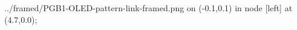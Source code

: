 \documentclass[preview]{standalone}
\begin{document}
\begin{zoomed}{../framed/PGB1-OLED-pattern-link-framed.png}
    \spy [size=3cm] on (-0.1,0.1) in node [left] at (4.7,0.0);
\end{zoomed}
\end{document}
